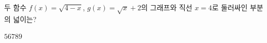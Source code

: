 \hspace*{2mm}\begin{minipage}[t]{\dimexpr\linewidth-2mm\relax}\vspace{0pt}
두 함수 $f(x)=\sqrt{4-x}$, $g(x)=\sqrt{x}+2$의 그래프와 직선 $x=4$로 둘러싸인 부분의 넓이는?
\begin{choices32}{$5$}{$6$}{$7$}{$8$}{$9$}\end{choices32}\end{minipage}
